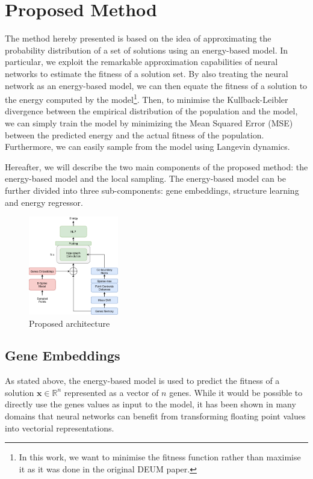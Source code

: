 \section{Proposed Method}
\label{sec:proposed_method}

The method hereby presented is based on the idea of approximating the probability distribution of a set of solutions using an energy-based model. In particular, we exploit the remarkable approximation capabilities of neural networks to estimate the fitness of a solution set. By also treating the neural network as an energy-based model, we can then equate the fitness of a solution to the energy computed by the model\footnote{In this work, we want to minimise the fitness function rather than maximise it as it was done in the original DEUM paper.}. Then, to minimise the Kullback-Leibler divergence between the empirical distribution of the population and the model, we can simply train the model by minimizing the Mean Squared Error (MSE) between the predicted energy and the actual fitness of the population. Furthermore, we can easily sample from the model using Langevin dynamics.

Hereafter, we will describe the two main components of the proposed method: the energy-based model and the local sampling. The energy-based model can be further divided into three sub-components: gene embeddings, structure learning and energy regressor.

\begin{figure}[H]
    \centering
    \includegraphics[width=0.35\textwidth]{img/model.png}
    \caption{Proposed architecture}
    \label{fig:method}
\end{figure}

\subsection*{Gene Embeddings}

As stated above, the energy-based model is used to predict the fitness of a solution $\mathbf{x} \in \mathbb{R}^n$ represented as a vector of $n$ genes. While it would be possible to directly use the genes values as input to the model, it has been shown in many domains that neural networks can benefit from transforming floating point values into vectorial representations.

